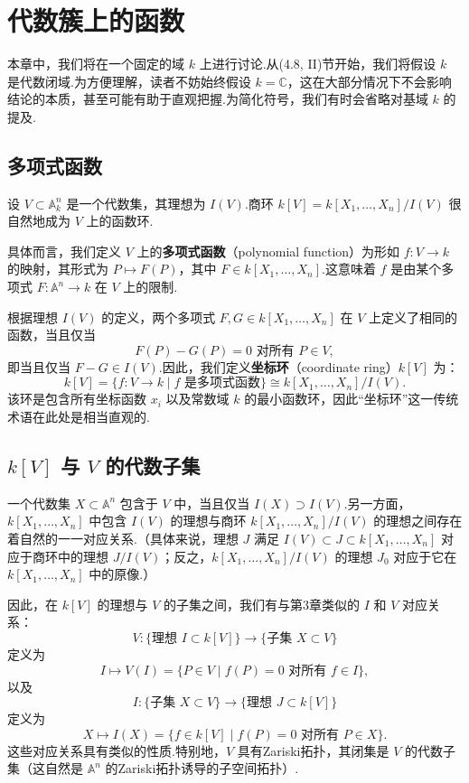 \chapter{代数簇上的函数}

本章中，我们将在一个固定的域 \(k\) 上进行讨论.从(4.8, II)节开始，我们将假设 \(k\) 是代数闭域.为方便理解，读者不妨始终假设 \(k = \mathbb{C}\)，这在大部分情况下不会影响结论的本质，甚至可能有助于直观把握.为简化符号，我们有时会省略对基域 \(k\) 的提及.

\section{多项式函数}

设 \(V \subset  {\mathbb{A}}_{k}^{n}\) 是一个代数集，其理想为 \(I(V)\).商环 \(k[V] = k[X_1, \ldots, X_n]/I(V)\) 很自然地成为 \(V\) 上的函数环.

具体而言，我们定义 \(V\) 上的\textbf{多项式函数}（polynomial function）为形如 \(f : V \rightarrow  k\) 的映射，其形式为 \(P \mapsto  F(P)\)，其中 \(F \in  k[X_1, \ldots, X_n]\).这意味着 \(f\) 是由某个多项式 \(F : {\mathbb{A}}^{n} \rightarrow  k\) 在 \(V\) 上的限制.

根据理想 \(I(V)\) 的定义，两个多项式 \(F, G \in  k[X_1, \ldots, X_n]\) 在 \(V\) 上定义了相同的函数，当且仅当
\[
F(P) - G(P) = 0 \text{ 对所有 } P \in  V,
\]
即当且仅当 \(F - G \in  I(V)\).因此，我们定义\textbf{坐标环}（coordinate ring）\(k[V]\) 为：
\[
k[V] = \{ f : V \rightarrow  k \mid  f \text{ 是多项式函数} \} \cong  k[X_1, \ldots, X_n]/I(V).
\]
该环是包含所有坐标函数 \(x_i\) 以及常数域 \(k\) 的最小函数环，因此“坐标环”这一传统术语在此处是相当直观的.

\section{\(k[V]\) 与 \(V\) 的代数子集}

一个代数集 \(X \subset  {\mathbb{A}}^{n}\) 包含于 \(V\) 中，当且仅当 \(I(X) \supset  I(V)\).另一方面，\(k[X_1, \ldots, X_n]\) 中包含 \(I(V)\) 的理想与商环 \(k[X_1, \ldots, X_n]/I(V)\) 的理想之间存在着自然的一一对应关系.（具体来说，理想 \(J\) 满足 \(I(V) \subset  J \subset  k[X_1, \ldots, X_n]\) 对应于商环中的理想 \(J/I(V)\)；反之，\(k[X_1, \ldots, X_n]/I(V)\) 的理想 \({J}_{0}\) 对应于它在 \(k[X_1, \ldots, X_n]\) 中的原像.）

因此，在 \(k[V]\) 的理想与 \(V\) 的子集之间，我们有与第3章类似的 \(I\) 和 \(V\) 对应关系：
\[
V: \{ \text{理想 } I \subset  k[V] \} \to \{ \text{子集 } X \subset  V \}
\]
定义为
\[
I \mapsto  V(I) = \{ P \in  V \mid  f(P) = 0 \text{ 对所有 } f \in  I \},
\]
以及
\[
I: \{ \text{子集 } X \subset  V \} \to \{ \text{理想 } J \subset  k[V] \}
\]
定义为
\[
X \mapsto I(X) = \{ f \in  k[V] \mid  f(P) = 0 \text{ 对所有 } P \in  X \}.
\]
这些对应关系具有类似的性质.特别地，\(V\) 具有Zariski拓扑，其闭集是 \(V\) 的代数子集（这自然是 \({\mathbb{A}}^{n}\) 的Zariski拓扑诱导的子空间拓扑）.

